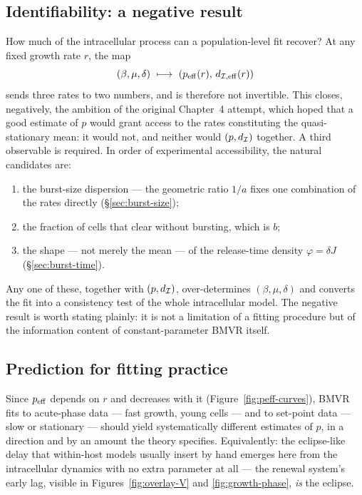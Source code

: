 \subsection{Identifiability: a negative result}
\label{sec:identifiability}

How much of the intracellular process can a population-level fit recover?
At any fixed growth rate $r$, the map
\begin{equation}
(\beta,\mu,\delta)\ \longmapsto\ \lrb{p_{\rm eff}(r),\,d_{\Icell,{\rm eff}}(r)}
\end{equation}
sends three rates to two numbers, and is therefore not invertible. This
closes, negatively, the ambition of the original Chapter~4 attempt, which
hoped that a good estimate of $p$ would grant access to the rates
constituting the quasi-stationary mean: it would not, and neither would
$(p,d_{\mathcal{I}})$ together. A third observable is required. In order of
experimental accessibility, the natural candidates are:
\begin{enumerate}
\item the burst-size dispersion --- the geometric ratio $1/a$ fixes one
combination of the rates directly (\S\ref{sec:burst-size});
\item the fraction of cells that clear without bursting, which is $b$;
\item the shape --- not merely the mean --- of the release-time density
$\varphi=\delta J$ (\S\ref{sec:burst-time}).
\end{enumerate}
Any one of these, together with $(p,d_{\mathcal{I}})$, over-determines
$(\beta,\mu,\delta)$ and converts the fit into a consistency test of the
whole intracellular model. The negative result is worth stating plainly: it
is not a limitation of a fitting procedure but of the information content
of constant-parameter BMVR itself.

\subsection{Prediction for fitting practice}

Since $p_{\rm eff}$ depends on $r$ and decreases with it
(Figure~\ref{fig:peff-curves}), BMVR fits to acute-phase data --- fast
growth, young cells --- and to set-point data --- slow or stationary ---
should yield systematically different estimates of $p$, in a direction and
by an amount the theory specifies. Equivalently: the eclipse-like delay
that within-host models usually insert by hand emerges here from the
intracellular dynamics with no extra parameter at all --- the renewal
system's early lag, visible in Figures~\ref{fig:overlay-V} and
\ref{fig:growth-phase}, \emph{is} the eclipse.

